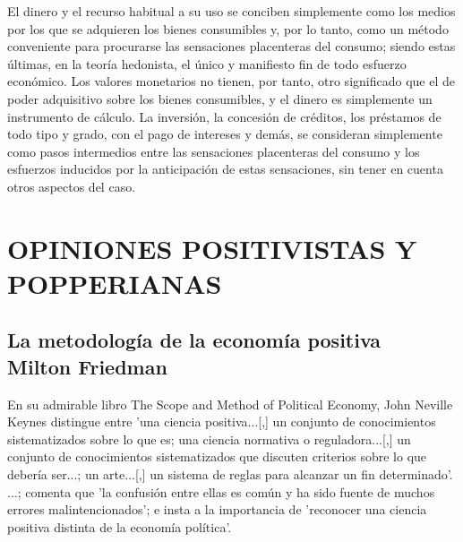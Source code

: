 El dinero y el recurso habitual a su uso se conciben simplemente como los medios por los que se adquieren los bienes consumibles y, por lo tanto, como un método conveniente para procurarse las sensaciones placenteras del consumo; siendo estas últimas, en la teoría hedonista, el único y manifiesto fin de todo esfuerzo económico. Los valores monetarios no tienen, por tanto, otro significado que el de poder adquisitivo sobre los bienes consumibles, y el dinero es simplemente un instrumento de cálculo. La inversión, la concesión de créditos, los préstamos de todo tipo y grado, con el pago de intereses y demás, se consideran simplemente como pasos intermedios entre las sensaciones placenteras del consumo y los esfuerzos inducidos por la anticipación de estas sensaciones, sin tener en cuenta otros aspectos del caso. 

\part{OPINIONES POSITIVISTAS Y POPPERIANAS
}

\chapter{La metodología de la economía positiva \\ Milton Friedman}

En su admirable libro The Scope and Method of Political Economy, John Neville Keynes distingue entre 'una ciencia positiva...[,] un conjunto de conocimientos sistematizados sobre lo que es; una ciencia normativa o reguladora...[,] un conjunto de conocimientos sistematizados que discuten criterios sobre lo que debería ser...; un arte...[,] un sistema de reglas para alcanzar un fin determinado'. ...; comenta que 'la confusión entre ellas es común y ha sido fuente de muchos errores malintencionados'; e insta a la importancia de 'reconocer una ciencia positiva distinta de la economía política'.\\

